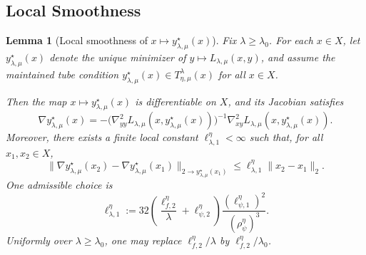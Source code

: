 \documentclass{article}
\newtheorem{lemma}{Lemma}
\begin{document}
\subsection{Local Smoothness}


\begin{lemma}[Local smoothness of \(x\mapsto y_{\lambda,\mu}^\star(x)\)]
\label{lem:proxy_jacobian_lipschitz}
Fix \(\lambda\ge \lambda_0\). For each \(x\in X\), let
\(y_{\lambda,\mu}^\star(x)\) denote the unique minimizer of
\(y\mapsto L_{\lambda,\mu}(x,y)\), and assume the maintained tube condition
\(y_{\lambda,\mu}^\star(x)\in T_{\eta,\mu}^{\lambda}(x)\) for all
\(x\in X\).

Then the map \(x\mapsto y_{\lambda,\mu}^\star(x)\) is differentiable on
\(X\), and its Jacobian satisfies
\begin{equation}
\label{eq:proxy_jacobian_formula}
\nabla y_{\lambda,\mu}^\star(x)
=
-\Big(\nabla^2_{yy}L_{\lambda,\mu}
(x,y_{\lambda,\mu}^\star(x))\Big)^{-1}
\nabla^2_{xy}L_{\lambda,\mu}
(x,y_{\lambda,\mu}^\star(x)).
\end{equation}
Moreover, there exists a finite local constant \(\ell_{\lambda,1}^\eta<\infty\) such that,
for all \(x_1,x_2\in X\),
\begin{equation}
\label{eq:proxy_jacobian_lipschitz}
\big\|
\nabla y_{\lambda,\mu}^\star(x_2)
-
\nabla y_{\lambda,\mu}^\star(x_1)
\big\|_{2\to y_{\lambda,\mu}^\star(x_1)}
\le
\ell_{\lambda,1}^\eta\|x_2-x_1\|_2 .
\end{equation}
One admissible choice is
\begin{equation}
\label{eq:proxy_jacobian_constant}
\ell_{\lambda,1}^\eta
:=
32\left(
\frac{\ell_{f,2}^\eta}{\lambda}
+
\ell_{\psi,2}^\eta
\right)
\frac{(\ell_{\psi,1}^\eta)^2}{(\rho_\psi^\eta)^3}.
\end{equation}
Uniformly over \(\lambda\ge\lambda_0\), one may replace
\(\ell_{f,2}^\eta/\lambda\) by \(\ell_{f,2}^\eta/\lambda_0\).
\end{lemma}
\end{document}
